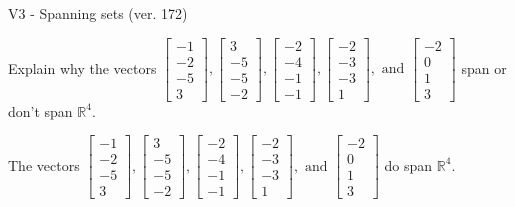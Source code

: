 \begin{exercise}
  \begin{exerciseTitle}V3 - Spanning sets (ver. 172)\end{exerciseTitle}
  \begin{exerciseStatement}
    Explain why the vectors \(\left[\begin{array}{r}
-1 \\
-2 \\
-5 \\
3
\end{array}\right] , \left[\begin{array}{r}
3 \\
-5 \\
-5 \\
-2
\end{array}\right] , \left[\begin{array}{r}
-2 \\
-4 \\
-1 \\
-1
\end{array}\right] , \left[\begin{array}{r}
-2 \\
-3 \\
-3 \\
1
\end{array}\right] , \text{ and } \left[\begin{array}{r}
-2 \\
0 \\
1 \\
3
\end{array}\right]\) span or don't span \(\mathbb{R}^4\). 
	


  \end{exerciseStatement}
  \begin{exerciseAnswer}
   The vectors \(\left[\begin{array}{r}
-1 \\
-2 \\
-5 \\
3
\end{array}\right] , \left[\begin{array}{r}
3 \\
-5 \\
-5 \\
-2
\end{array}\right] , \left[\begin{array}{r}
-2 \\
-4 \\
-1 \\
-1
\end{array}\right] , \left[\begin{array}{r}
-2 \\
-3 \\
-3 \\
1
\end{array}\right] , \text{ and } \left[\begin{array}{r}
-2 \\
0 \\
1 \\
3
\end{array}\right]\) 
  	 do  
	span \(\mathbb{R}^4\).
  



\end{exerciseAnswer}
\end{exercise}
